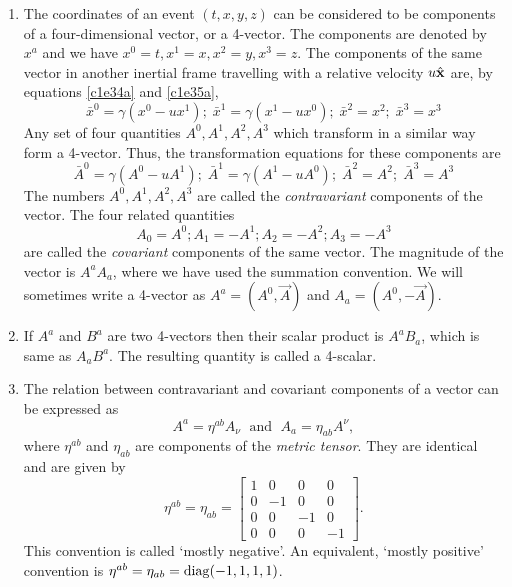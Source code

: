 \begin{enumerate}
\item The coordinates of an event $(t, x, y, z)$ can be considered to be
components of a four-dimensional vector, or a 4-vector. The components are
denoted by $x^a$ and we have $x^0 = t, x^1 = x, x^2 = y, x^3 = z$. The 
components of the same vector in another inertial frame travelling with a 
relative velocity $u\hat{\mathbf{x}}$ are, by equations \eqref{c1e34a} and \eqref{c1e35a},
\[
\bar{x}^0 = \gamma(x^0 - ux^1);\;
\bar{x}^1 = \gamma(x^1 - ux^0);\;
\bar{x}^2 = x^2;\;
\bar{x}^3 = x^3
\]
Any set of four quantities $A^0, A^1, A^2, A^3$ which transform in a similar
way form a 4-vector. Thus, the transformation equations for these components
are
\begin{equation}\label{c1e46}
\bar{A}^0 = \gamma(A^0 - uA^1);\;
\bar{A}^1 = \gamma(A^1 - uA^0);\;
\bar{A}^2 = A^2;\;
\bar{A}^3 = A^3
\end{equation}
The numbers $A^0, A^1, A^2, A^3$ are called the \emph{contravariant} components
of the vector. The four related quantities
\begin{equation}\label{c1e47}
A_0 = A^0; A_1 = -A^1; A_2 = -A^2; A_3 = -A^3
\end{equation}
are called the \emph{covariant} components of the same vector. The magnitude of
the vector is $A^a A_a$, where we have used the summation convention. We 
will sometimes write a 4-vector as $A^a = (A^0, \vec{A})$ and $A_a= 
(A^0, -\vec{A})$.

\item If $A^a$ and $B^a$ are two 4-vectors then their scalar product is 
$A^a B_a$, which is same as $A_a B^a$. The resulting quantity is called 
a 4-scalar. 

\item The relation between contravariant and covariant components of a vector
can be expressed as
\begin{equation}\label{c1e48}
A^a = \eta^{ab}A_\nu\;\text{ and }\; A_a = \eta_{ab}A^\nu,
\end{equation}
where $\eta^{ab}$ and $\eta_{ab}$ are components of the \emph{metric 
tensor}. They are identical and are given by
\begin{equation}\label{c1e49}
\eta^{ab} = \eta_{ab} = \begin{bmatrix}1 & 0 & 0 & 0 \\
0 & -1 & 0 & 0 \\
0 & 0 & -1 & 0 \\
0 & 0 & 0 & -1
\end{bmatrix}.
\end{equation}
This convention is called `mostly negative'. An equivalent, `mostly positive'
convention is $\eta^{ab} = \eta_{ab} = \operatorname{diag}(-1, 1, 1, 1)$.


\end{enumerate}
